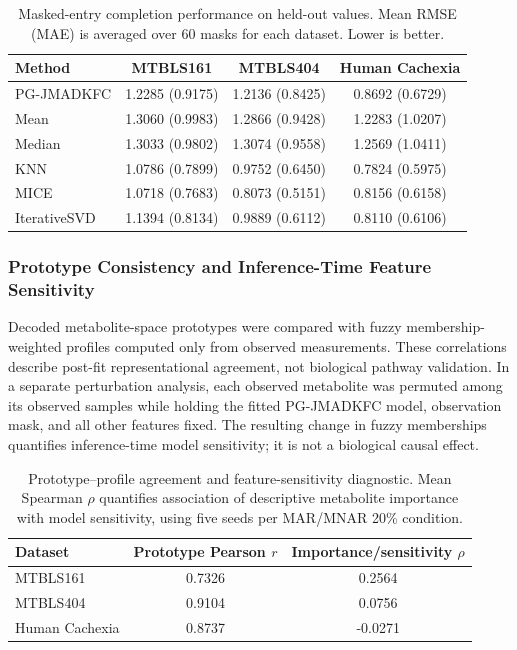 \begin{table}[t]
\centering
\caption{Masked-entry completion performance on held-out values. Mean RMSE (MAE) is averaged over 60 masks for each dataset. Lower is better.}
\label{tab:pg_completion_baselines}
\small
\begin{tabular}{lccc}
\toprule
Method & MTBLS161 & MTBLS404 & Human Cachexia \\
\midrule
PG-JMADKFC & 1.2285 (0.9175) & 1.2136 (0.8425) & 0.8692 (0.6729)\\
Mean & 1.3060 (0.9983) & 1.2866 (0.9428) & 1.2283 (1.0207)\\
Median & 1.3033 (0.9802) & 1.3074 (0.9558) & 1.2569 (1.0411)\\
KNN & 1.0786 (0.7899) & 0.9752 (0.6450) & 0.7824 (0.5975)\\
MICE & 1.0718 (0.7683) & 0.8073 (0.5151) & 0.8156 (0.6158)\\
IterativeSVD & 1.1394 (0.8134) & 0.9889 (0.6112) & 0.8110 (0.6106)\\
\bottomrule
\end{tabular}
\end{table}

\subsubsection{Prototype Consistency and Inference-Time Feature Sensitivity}
Decoded metabolite-space prototypes were compared with fuzzy membership-weighted profiles computed only from observed measurements. These correlations describe post-fit representational agreement, not biological pathway validation. In a separate perturbation analysis, each observed metabolite was permuted among its observed samples while holding the fitted PG-JMADKFC model, observation mask, and all other features fixed. The resulting change in fuzzy memberships quantifies inference-time model sensitivity; it is not a biological causal effect.

\begin{table}[t]
\centering
\caption{Prototype--profile agreement and feature-sensitivity diagnostic. Mean Spearman $\rho$ quantifies association of descriptive metabolite importance with model sensitivity, using five seeds per MAR/MNAR 20\% condition.}
\label{tab:pg_feature_sensitivity}
\small
\begin{tabular}{lcc}
\toprule
Dataset & Prototype Pearson $r$ & Importance/sensitivity $\rho$ \\
\midrule
MTBLS161 & 0.7326 & 0.2564 \\
MTBLS404 & 0.9104 & 0.0756 \\
Human Cachexia & 0.8737 & -0.0271 \\
\bottomrule
\end{tabular}
\end{table}

